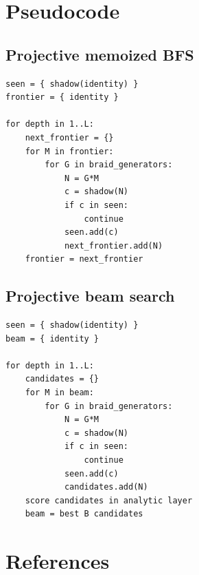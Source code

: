 \documentclass[11pt]{article}
\begin{document}
\section{Pseudocode}

\subsection*{Projective memoized BFS}

\begin{verbatim}
seen = { shadow(identity) }
frontier = { identity }

for depth in 1..L:
    next_frontier = {}
    for M in frontier:
        for G in braid_generators:
            N = G*M
            c = shadow(N)
            if c in seen:
                continue
            seen.add(c)
            next_frontier.add(N)
    frontier = next_frontier
\end{verbatim}

\subsection*{Projective beam search}

\begin{verbatim}
seen = { shadow(identity) }
beam = { identity }

for depth in 1..L:
    candidates = {}
    for M in beam:
        for G in braid_generators:
            N = G*M
            c = shadow(N)
            if c in seen:
                continue
            seen.add(c)
            candidates.add(N)
    score candidates in analytic layer
    beam = best B candidates
\end{verbatim}

\section{References}
\end{document}
